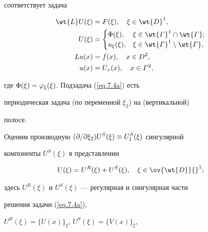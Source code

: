 соответствует задача


\begin{subequations} \label{eq.7.4}


\begin{align}\label{eq.7.4a}


\wt{L} U(\xi) &= F(\xi), \quad


\xi \in \wt{D}^1, \\


U(\xi) &=\begin{cases}


\Phi(\xi), & \xi\in\wt{\varGamma}^1\cap \wt{\varGamma}; \\


u_{\xi}(\xi), & \xi\in\wt{\varGamma}^1\setminus \wt{\varGamma},


\end{cases}


\notag\\


%


\label{eq.7.4b}


L u(x) &=f(x), \quad x\in D^2, \\


u(x)& = U_x(x), \quad x\in\varGamma^2,\notag


\end{align}


\end{subequations}


где $\Phi(\xi)=\varphi_{\xi}(\xi)$. Подзадача (\ref{eq.7.4a}) есть


периодическая задача (по переменной $\xi_2$) на (вертикальной)


полосе.





Оценим производную $(\displaystyle\partial/\displaystyle\partial\xi_2)U^S(\xi)\equiv U_1^S(\xi)$ сингулярной


компоненты $U^S(\xi)$ в представлении


\begin{equation}\label{eq.7.5}


U(\xi)=U^R(\xi)+U^S(\xi),\quad \xi\in \ov{\wt{D}}{}^1;


\end{equation}


здесь $U^R(\xi)$ и $U^S(\xi)$ --- регулярная и сингулярная части


решения задачи (\ref{eq.7.4a}),


$U^R(\xi)=\{U(x)\}_{\xi}$, $U^S(\xi)=\{V(x)\}_{\xi}$,


